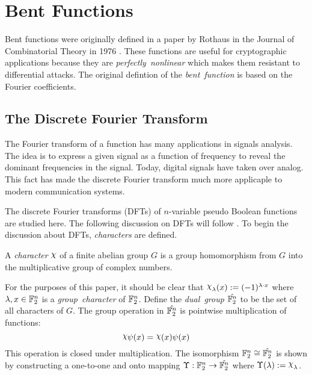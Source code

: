 \section{Bent Functions}
\par Bent functions were originally defined in a paper by Rothaus in the
Journal of Combinatorial Theory in 1976 \cite{art:r76}. These functions are
useful for cryptographic applications because they are {\em perfectly\ 
nonlinear} which makes them resistant to differential
attacks. The original defintion of the {\em bent\ function} is based on the
Fourier coefficients.

\subsection{The Discrete Fourier Transform}
\par The Fourier transform of a function has many applications in signals
analysis. The idea is to express a given signal as a function of frequency
to reveal the dominant frequencies in the signal. Today, digital signals
have taken over analog. This fact has made the discrete Fourier transform
much more applicaple to modern communication systems.

\par The discrete Fourier transforms (DFTs) of $n$-variable pseudo Boolean
functions are studied here. The following discussion on DFTs will follow
\cite{bk:t99}. To begin the discussion about DFTs, {\em characters} are
defined.

\begin{definition}\cite{bk:t99}
  A {\em character} $\Chi$ of a finite abelian group $G$ is a group
  homomorphism from $G$ into the multiplicative group of complex numbers.
\end{definition}

For the purposes of this paper, it should be clear that
$\Chi_\lambda(x):=(-1)^{\lambda\cdot x}$ where $\lambda,x\in\mathbb{F}_2^n$ is a
{\em group\ character} of $\mathbb{F}_2^n$. Define the {\em dual\ group}
$\hat{\mathbb{F}_2^n}$ to be the set of all characters of $G$. The group operation
in $\hat{\mathbb{F}_2^n}$ is pointwise multiplication of functions:
\[
\Chi\psi(x)=\Chi(x)\psi(x)
\]
This operation is closed under multiplication. The isomorphism
$\mathbb{F}_2^n\cong\hat{\mathbb{F}_2^n}$ is shown by constructing a one-to-one and onto
mapping $\Upsilon:\mathbb{F}_2^n\rightarrow\hat{\mathbb{F}_2^n}$ where
$\Upsilon(\lambda):=\Chi_\lambda$.

